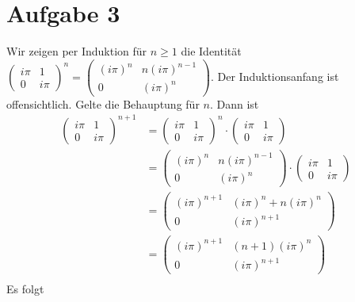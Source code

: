 \documentclass{article}
\begin{document}
    \section*{Aufgabe 3}
    Wir zeigen per Induktion für $n \geq 1$ die Identität
    $\begin{pmatrix}
        i\pi & 1\\
        0 & i\pi
    \end{pmatrix}^n = \begin{pmatrix}
        (i\pi)^n & n (i\pi)^{n-1}\\
        0 & (i\pi)^n
    \end{pmatrix}$.
    Der Induktionsanfang ist offensichtlich.
    Gelte die Behauptung für $n$. Dann ist
    \begin{align*}
        \begin{pmatrix}
            i\pi & 1\\
            0 & i\pi
        \end{pmatrix}^{n+1} &= \begin{pmatrix}
            i\pi & 1\\
            0 & i\pi
        \end{pmatrix}^{n} \cdot \begin{pmatrix}
            i\pi & 1\\
            0 & i\pi
        \end{pmatrix}\\
        &= \begin{pmatrix}
            (i\pi)^n & n (i\pi)^{n-1}\\
            0 & (i\pi)^n
        \end{pmatrix} \cdot \begin{pmatrix}
            i\pi & 1\\
            0 & i\pi
        \end{pmatrix}\\
        &= \begin{pmatrix}
            (i\pi)^{n+1} & (i\pi)^n + n(i\pi)^n\\
            0 & (i\pi)^{n+1}
        \end{pmatrix}\\
        &= \begin{pmatrix}
            (i\pi)^{n+1} & (n+1)(i\pi)^n\\
            0 & (i\pi)^{n+1}
        \end{pmatrix}\\
    \end{align*}
    Es folgt
\end{document}

